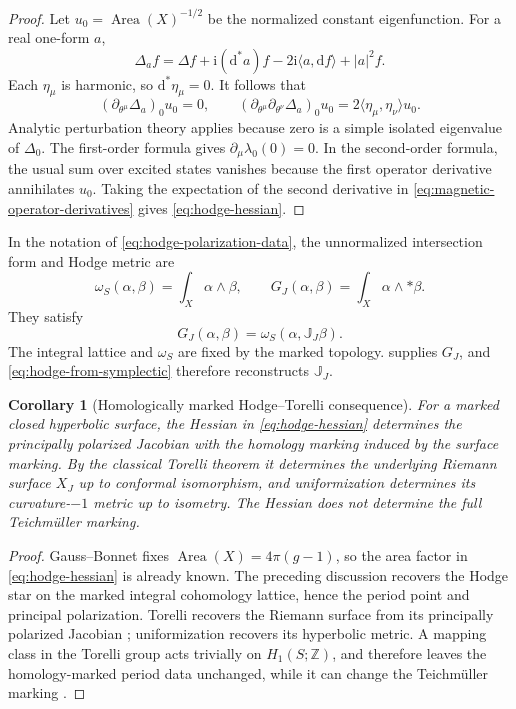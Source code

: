 \documentclass[11pt]{article}
\newtheorem{corollary}[theorem]{Corollary}
\theoremstyle{definition}
\theoremstyle{remark}
\newcommand{\ZZ}{\mathbb Z}
\newcommand{\dd}{\mathrm d}
\newcommand{\ii}{\mathrm i}
\begin{document}
\begin{proof}
Let \(u_0=\operatorname{Area}(X)^{-1/2}\) be the normalized constant
eigenfunction.  For a real one-form \(a\),
\[
 \Delta_a f
   =\Delta f+\ii(\dd^*a)f
      -2\ii\langle a,\dd f\rangle+|a|^2f .
 \tag{5.8}\label{eq:magnetic-laplacian-expanded}
\]
Each \(\eta_\mu\) is harmonic, so \(\dd^*\eta_\mu=0\).  It follows that
\[
   \left(\partial_{\theta^\mu}\Delta_a\right)_0u_0=0,
 \qquad
   \left(
     \partial_{\theta^\mu}\partial_{\theta^\nu}\Delta_a
   \right)_0u_0
       =2\langle\eta_\mu,\eta_\nu\rangle u_0 .
 \tag{5.9}\label{eq:magnetic-operator-derivatives}
\]
Analytic perturbation theory applies because zero is a simple isolated
eigenvalue of \(\Delta_0\).  The first-order formula gives
\(\partial_\mu\lambda_0(0)=0\).  In the second-order formula, the usual
sum over excited states vanishes because the first operator derivative
annihilates \(u_0\).  Taking the expectation of the second derivative in
\eqref{eq:magnetic-operator-derivatives} gives
\eqref{eq:hodge-hessian}.
\end{proof}

In the notation of \eqref{eq:hodge-polarization-data}, the unnormalized
intersection form and Hodge metric are
\[
 \omega_S(\alpha,\beta)=\int_X\alpha\wedge\beta,
 \qquad
 G_J(\alpha,\beta)=\int_X\alpha\wedge *\beta .
 \tag{5.10}\label{eq:intersection-hodge-pair}
\]
They satisfy
\[
                    G_J(\alpha,\beta)
                       =\omega_S(\alpha,\mathbb J_J\beta).
                       \tag{5.11}\label{eq:hodge-from-symplectic}
\]
The integral lattice and \(\omega_S\) are fixed by the marked topology.
 supplies \(G_J\), and
\eqref{eq:hodge-from-symplectic} therefore reconstructs
\(\mathbb J_J\).

\begin{corollary}[Homologically marked Hodge--Torelli consequence]
\label{cor:torelli-from-band}
For a marked closed hyperbolic surface, the Hessian in
\eqref{eq:hodge-hessian} determines the principally polarized Jacobian with
the homology marking induced by the surface marking.  By the classical
Torelli theorem it determines the underlying Riemann surface \(X_J\) up to
conformal isomorphism, and uniformization determines its curvature-\(-1\)
metric up to isometry.  The Hessian does not determine the full
Teichm\"uller marking.
\end{corollary}

\begin{proof}
Gauss--Bonnet fixes
\(\operatorname{Area}(X)=4\pi(g-1)\), so the area factor in
\eqref{eq:hodge-hessian} is already known.  The preceding discussion
recovers the Hodge star on the marked integral cohomology lattice, hence the
period point and principal polarization.  Torelli recovers the Riemann
surface from its principally polarized Jacobian
\cite{FarkasKra,BirkenhakeLange}; uniformization recovers its hyperbolic
metric.  A mapping class in the Torelli group acts trivially on
\(H_1(S;\ZZ)\), and therefore leaves the homology-marked period data
unchanged, while it can change the Teichm\"uller marking
\cite{FarbMargalit}.
\end{proof}
\end{document}
